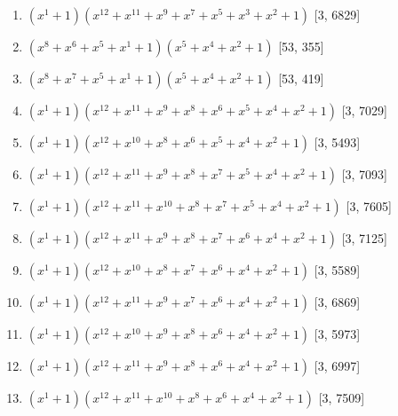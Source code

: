 \documentclass[10pt,twocolumn]{article}
\begin{document}
\begin{enumerate}
\item $(x^{1} + 1)(x^{12} + x^{11} + x^{9} + x^{7} + x^{5} + x^{3} + x^{2} + 1)$  [3, 6829]
\item $(x^{8} + x^{6} + x^{5} + x^{1} + 1)(x^{5} + x^{4} + x^{2} + 1)$  [53, 355]
\item $(x^{8} + x^{7} + x^{5} + x^{1} + 1)(x^{5} + x^{4} + x^{2} + 1)$  [53, 419]
\item $(x^{1} + 1)(x^{12} + x^{11} + x^{9} + x^{8} + x^{6} + x^{5} + x^{4} + x^{2} + 1)$  [3, 7029]
\item $(x^{1} + 1)(x^{12} + x^{10} + x^{8} + x^{6} + x^{5} + x^{4} + x^{2} + 1)$  [3, 5493]
\item $(x^{1} + 1)(x^{12} + x^{11} + x^{9} + x^{8} + x^{7} + x^{5} + x^{4} + x^{2} + 1)$  [3, 7093]
\item $(x^{1} + 1)(x^{12} + x^{11} + x^{10} + x^{8} + x^{7} + x^{5} + x^{4} + x^{2} + 1)$  [3, 7605]
\item $(x^{1} + 1)(x^{12} + x^{11} + x^{9} + x^{8} + x^{7} + x^{6} + x^{4} + x^{2} + 1)$  [3, 7125]
\item $(x^{1} + 1)(x^{12} + x^{10} + x^{8} + x^{7} + x^{6} + x^{4} + x^{2} + 1)$  [3, 5589]
\item $(x^{1} + 1)(x^{12} + x^{11} + x^{9} + x^{7} + x^{6} + x^{4} + x^{2} + 1)$  [3, 6869]
\item $(x^{1} + 1)(x^{12} + x^{10} + x^{9} + x^{8} + x^{6} + x^{4} + x^{2} + 1)$  [3, 5973]
\item $(x^{1} + 1)(x^{12} + x^{11} + x^{9} + x^{8} + x^{6} + x^{4} + x^{2} + 1)$  [3, 6997]
\item $(x^{1} + 1)(x^{12} + x^{11} + x^{10} + x^{8} + x^{6} + x^{4} + x^{2} + 1)$  [3, 7509]
\end{enumerate}
\end{document}
